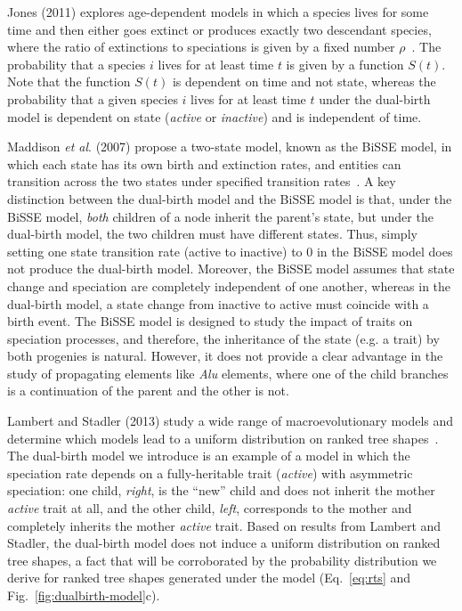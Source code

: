 Jones (2011) explores age-dependent models in which a species lives for some time and then either goes extinct or produces exactly two descendant species, where the ratio of extinctions to speciations is given by a fixed number $\rho$~\cite{Jones2011}. The probability that a species $i$ lives for at least time $t$ is given by a function $S(t)$. Note that the function $S(t)$ is dependent on time and not state, whereas the probability that a given species $i$ lives for at least time $t$ under the dual-birth model is dependent on state (\textit{active} or \textit{inactive}) and is independent of time.

Maddison \textit{et al}. (2007) propose a two-state model, known as the BiSSE model, in which each state has its own birth and extinction rates, and entities can transition across the two states under specified transition rates~\cite{Maddison2007}. A key distinction between the dual-birth model and the BiSSE model is that, under the BiSSE model, \textit{both} children of a node inherit the parent's state, but under the dual-birth model, the two children must have different states. Thus, simply setting one state transition rate (active to inactive) to 0 in the BiSSE model does not produce the dual-birth model. Moreover, the BiSSE model assumes that state change and speciation are completely independent of one another, whereas in the dual-birth model, a state change from inactive to active must coincide with a birth event. The BiSSE model is designed to study the impact of traits on speciation processes, and therefore, the inheritance of the state (e.g. a trait) by both progenies is natural. However, it does not provide a clear advantage in  the study of propagating elements like \textit{Alu} elements, where one of the child branches is a continuation of the parent and the other is not.

Lambert and Stadler (2013) study a wide range of macroevolutionary models and
determine which models lead to a uniform distribution on ranked tree shapes~\cite{Lambert2013}. The dual-birth model we introduce is an example of a model in which the speciation rate depends on a fully-heritable trait (\textit{active}) with asymmetric speciation: one child, \textit{right}, is the ``new'' child and does not inherit the mother \textit{active} trait at all, and the other child, \textit{left}, corresponds to the mother and completely inherits the mother \textit{active} trait. Based on results from Lambert and Stadler, the dual-birth model does not induce a uniform distribution on ranked tree shapes, a fact that will be corroborated by the probability distribution we derive for ranked tree shapes generated under the model (Eq.~\ref{eq:rts} and Fig.~\ref{fig:dualbirth-model}c).

